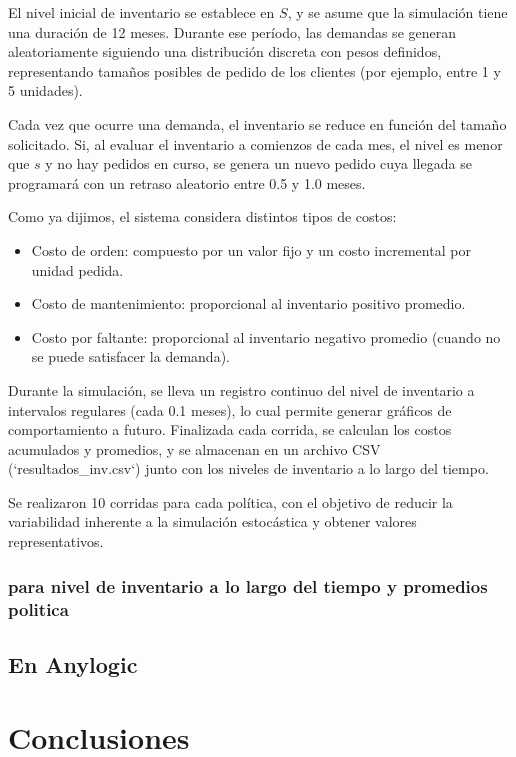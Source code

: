 \documentclass{article}
\begin{document}
El nivel inicial de inventario se establece en \( S \), y se asume que la simulación tiene una duración de 12 meses. Durante ese período, las demandas se generan aleatoriamente siguiendo una distribución discreta con pesos definidos, representando tamaños posibles de pedido de los clientes (por ejemplo, entre 1 y 5 unidades).

Cada vez que ocurre una demanda, el inventario se reduce en función del tamaño solicitado. Si, al evaluar el inventario a comienzos de cada mes, el nivel es menor que \( s \) y no hay pedidos en curso, se genera un nuevo pedido cuya llegada se programará con un retraso aleatorio entre 0.5 y 1.0 meses.

Como ya dijimos, el sistema considera distintos tipos de costos:

\begin{itemize}
    \item Costo de orden: compuesto por un valor fijo y un costo incremental por unidad pedida.
    \item Costo de mantenimiento: proporcional al inventario positivo promedio.
    \item Costo por faltante: proporcional al inventario negativo promedio (cuando no se puede satisfacer la demanda).
\end{itemize}

Durante la simulación, se lleva un registro continuo del nivel de inventario a intervalos regulares (cada 0.1 meses), lo cual permite generar gráficos de comportamiento a futuro. Finalizada cada corrida, se calculan los costos acumulados y promedios, y se almacenan en un archivo CSV (`resultados_inv.csv`) junto con los niveles de inventario a lo largo del tiempo.

Se realizaron 10 corridas para cada política, con el objetivo de reducir la variabilidad inherente a la simulación estocástica y obtener valores representativos.

\subsubsection{para nivel de inventario a lo largo del tiempo y promedios politica}

\subsection{En Anylogic}


\section{Conclusiones}
\end{document}
